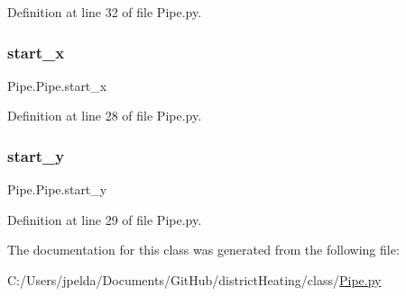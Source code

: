 Definition at line 32 of file Pipe.\+py.

\mbox{\label{class_pipe_1_1_pipe_a99b713a0d71ea921e5fdd7665a294598}} 
\subsubsection{\texorpdfstring{start\+\_\+x}{start\_x}}
{\footnotesize\ttfamily Pipe.\+Pipe.\+start\+\_\+x}



Definition at line 28 of file Pipe.\+py.

\mbox{\label{class_pipe_1_1_pipe_a9104dacc2e9f3541a8171c7d7bbf8a2e}} 
\subsubsection{\texorpdfstring{start\+\_\+y}{start\_y}}
{\footnotesize\ttfamily Pipe.\+Pipe.\+start\+\_\+y}



Definition at line 29 of file Pipe.\+py.



The documentation for this class was generated from the following file\+:\begin{DoxyCompactItemize}
\item 
C\+:/\+Users/jpelda/\+Documents/\+Git\+Hub/district\+Heating/class/\hyperlink{_pipe_8py}{Pipe.\+py}\end{DoxyCompactItemize}
